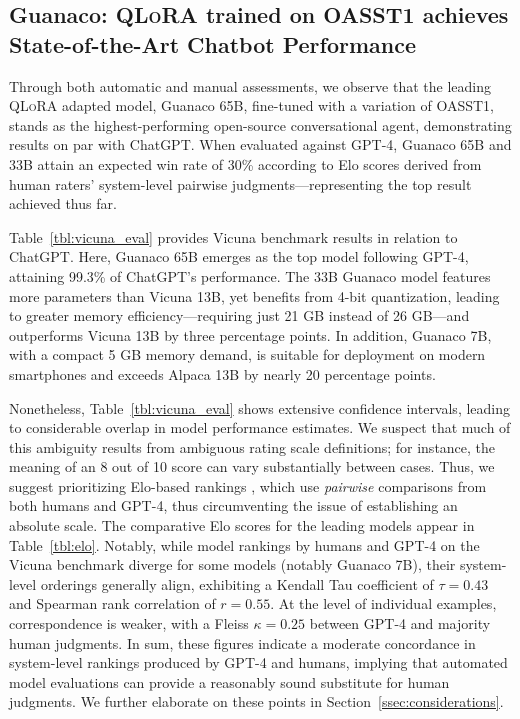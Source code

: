 \subsection{\textbf{Guanaco}: \textsc{QLoRA} trained on OASST1 achieves State-of-the-Art Chatbot Performance}

Through both automatic and manual assessments, we observe that the leading \textsc{QLoRA} adapted model, {Guanaco} 65B, fine-tuned with a variation of OASST1, stands as the highest-performing open-source conversational agent, demonstrating results on par with ChatGPT. When evaluated against GPT-4, {Guanaco} 65B and 33B attain an expected win rate of 30\% according to Elo scores derived from human raters' system-level pairwise judgments—representing the top result achieved thus far.

Table~\ref{tbl:vicuna_eval} provides Vicuna benchmark \cite{vicuna2023} results in relation to ChatGPT. Here, {Guanaco} 65B emerges as the top model following GPT-4, attaining 99.3\% of ChatGPT's performance. The 33B {Guanaco} model features more parameters than Vicuna 13B, yet benefits from 4-bit quantization, leading to greater memory efficiency—requiring just 21 GB instead of 26 GB—and outperforms Vicuna 13B by three percentage points. In addition, {Guanaco} 7B, with a compact 5 GB memory demand, is suitable for deployment on modern smartphones and exceeds Alpaca 13B by nearly 20 percentage points.

Nonetheless, Table~\ref{tbl:vicuna_eval} shows extensive confidence intervals, leading to considerable overlap in model performance estimates. We suspect that much of this ambiguity results from ambiguous rating scale definitions; for instance, the meaning of an 8 out of 10 score can vary substantially between cases. Thus, we suggest prioritizing Elo-based rankings \citep{elo1967proposed}, which use \textit{pairwise} comparisons from both humans and GPT-4, thus circumventing the issue of establishing an absolute scale. The comparative Elo scores for the leading models appear in Table~\ref{tbl:elo}. Notably, while model rankings by humans and GPT-4 on the Vicuna benchmark diverge for some models (notably Guanaco 7B), their system-level orderings generally align, exhibiting a Kendall Tau coefficient of $\tau=0.43$ and Spearman rank correlation of $r=0.55$. At the level of individual examples, correspondence is weaker, with a Fleiss $\kappa=0.25$ between GPT-4 and majority human judgments. In sum, these figures indicate a moderate concordance in system-level rankings produced by GPT-4 and humans, implying that automated model evaluations can provide a reasonably sound substitute for human judgments. We further elaborate on these points in Section~\ref{ssec:considerations}.

